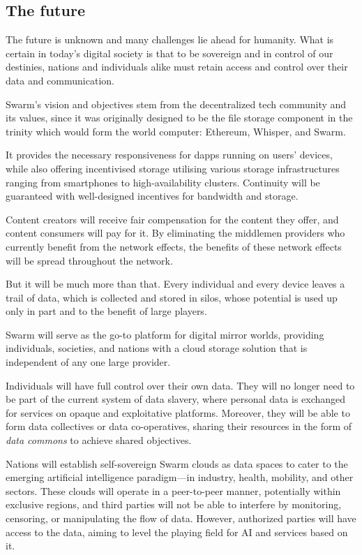 \subsection{The future} \label{sec:future}

The future is unknown and many challenges lie ahead for humanity. What is certain in today's digital society is that to be sovereign and in control of our destinies, nations and individuals alike must retain access and control over their data and communication.

Swarm's vision and objectives stem from the decentralized tech community and its values, since it was originally designed to be the file storage component in the trinity which would form the world computer: Ethereum, Whisper, and Swarm.

It provides the necessary responsiveness for dapps running on users' devices, while also offering incentivised storage utilising various storage infrastructures ranging from smartphones to high-availability clusters. Continuity will be guaranteed with well-designed incentives for bandwidth and storage.

Content creators will receive fair compensation for the content they offer, and content consumers will pay for it. By eliminating the middlemen providers who currently benefit from the network effects, the benefits of these network effects will be spread throughout the network.

But it will be much more than that. Every individual and every device leaves a trail of data, which is collected and stored in silos, whose potential is used up only in part and to the benefit of large players.

Swarm will serve as the go-to platform for digital mirror worlds, providing individuals, societies, and nations with a cloud storage solution that is independent of any one large provider. 


Individuals will have full control over their own data. They will no longer need to be part of the current system of data slavery, where personal data is exchanged for services on opaque and exploitative platforms. Moreover, they will be able to form data collectives or data co-operatives, sharing their resources in the form of \emph{data commons} to achieve shared objectives. 

Nations will establish self-sovereign Swarm clouds as data spaces to cater to the emerging artificial intelligence paradigm—in industry, health, mobility, and other sectors. These clouds will operate in a peer-to-peer manner, potentially within exclusive regions, and third parties will not be able to interfere by monitoring, censoring, or manipulating the flow of data. However, authorized parties will have access to the data, aiming to level the playing field for AI and services based on it.  

